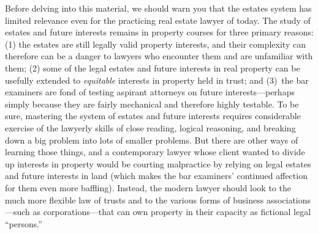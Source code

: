 Before delving into this material, we should warn you that the estates system
has limited relevance even for the practicing real estate lawyer of today. The
study of estates and future interests remains in property courses for three
primary reasons: (1) the estates are still legally valid property interests,
and their complexity can therefore can be a danger to lawyers who encounter
them and are unfamiliar with them; (2) some of the legal estates and future
interests in real property can be usefully extended to \textit{equitable}
interests in property held in trust; and (3)~the bar examiners are fond of
testing aspirant attorneys on future interests---perhaps simply because they
are fairly mechanical and therefore highly testable. To be sure, mastering the
system of estates and future interests requires considerable exercise of the
lawyerly skills of close reading, logical reasoning, and breaking down a big
problem into lots of smaller problems. But there are other ways of learning
those things, and a contemporary lawyer whose client wanted to divide up
interests in property would be courting malpractice by relying on legal estates
and future interests in land (which makes the bar examiners' continued
affection for them even more baffling). Instead, the modern lawyer should look
to the much more flexible law of trusts and to the various forms of business
associations---such as corporations---that can own property in their capacity
as fictional legal ``persons.''

